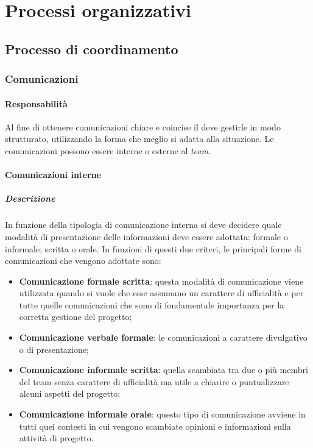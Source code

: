 
\section{Processi organizzativi}

\subsection{Processo di coordinamento}
\subsubsection{Comunicazioni}
\paragraph{Responsabilità}
Al fine di ottenere comunicazioni chiare e coincise il \textit{\RdP} deve gestirle in modo strutturato, utilizzando la forma che meglio si adatta alla situazione.
Le comunicazioni possono essere interne o esterne al \textit{team}.
\paragraph{Comunicazioni interne}
\subparagraph{Descrizione}
In funzione della tipologia di comunicazione interna si deve decidere quale modalità di presentazione delle informazioni deve essere adottata: formale o informale; scritta o orale.
In funzioni di questi due criteri, le principali forme di comunicazioni che vengono adottate sono:
\begin{itemize}
\item
\textbf{Comunicazione formale scritta}: questa modalità di comunicazione viene utilizzata quando si vuole che esse assumano un carattere di ufficialità e per tutte quelle comunicazioni che sono di fondamentale importanza per la corretta gestione del progetto;
\item
\textbf{Comunicazione verbale formale}: le comunicazioni a carattere divulgativo o di presentazione;
\item
\textbf{Comunicazione informale scritta}: quella scambiata tra due o più membri del team senza carattere di ufficialità ma utile a chiarire o puntualizzare alcuni aspetti del progetto;
\item
\textbf{Comunicazione informale orale}: questo tipo di comunicazione avviene in tutti quei contesti in cui vengono scambiate opinioni e informazioni sulla attività di progetto.
\end{itemize}

